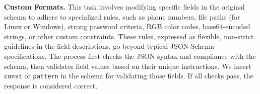 \textbf{Custom Formats.} 
This task involves modifying specific fields in the original schema to adhere to specialized rules, such as phone numbers, file paths (for Linux or Windows), strong password criteria, RGB color codes, base64-encoded strings, or other custom constraints. These rules, expressed as flexible, non-strict guidelines in the field descriptions, go beyond typical JSON Schema specifications. The process first checks the JSON syntax and compliance with the schema, then validates field values based on their unique instructions. We insert \texttt{const} or \texttt{pattern} in the schema for validating those fields. If all checks pass, the response is considered correct.

